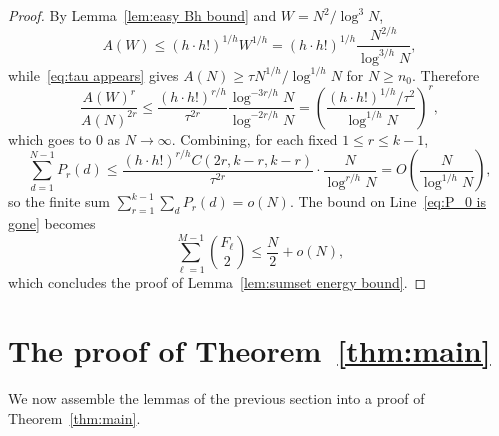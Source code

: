 \documentclass[10pt,letterpaper]{article}
\theoremstyle{remark}
\begin{document}
\begin{proof}
By Lemma~\ref{lem:easy Bh bound} and
$W=N^2/\log^3 N$,
\[
   A(W)\le(h\cdot h!)^{1/h}W^{1/h}
   =(h\cdot h!)^{1/h} \frac{N^{2/h}}{\log^{3/h} N},
\]
while~\eqref{eq:tau appears} gives $A(N)\ge \tau N^{1/h}/\log^{1/h} N$ for
$N\ge n_0$.  Therefore
\[
   \frac{A(W)^{r}}{A(N)^{2r}}
   \le\frac{(h\cdot h!)^{r/h}}{\tau^{2r}} 
     \frac{\log^{-3r/h} N}{\log^{-2r/h} N}
   =\left(\frac{(h\cdot h!)^{1/h} / \tau^{2}}{\log^{1/h} N}\right)^r,
\]
which goes to $0$ as $N\to \infty$.
Combining, for each fixed $1\le r\le k-1$,
  \[
   \sum_{d=1}^{N-1}P_r(d)
   \le\frac{(h\cdot h!)^{r/h} C(2r,k-r,k-r)}{\tau^{2r}}\cdot
     \frac{N}{\log^{r/h} N}=O\left(\frac{N}{\log^{1/h} N}\right),
  \]
so the finite sum $\sum_{r=1}^{k-1}\sum_{d}P_r(d)=o(N)$.  The bound on Line~\eqref{eq:P_0 is gone} becomes
  \[   \sum_{\ell=1}^{M-1}\binom{F_\ell}{2}\le\frac{N}{2}+o(N), \]
which concludes the proof of Lemma~\ref{lem:sumset energy bound}.
\end{proof}


 

\section{The proof of Theorem~\ref{thm:main}}\label{sec:main proof} 
We now assemble the lemmas of the previous section into a proof of Theorem~\ref{thm:main}.
\end{document}

